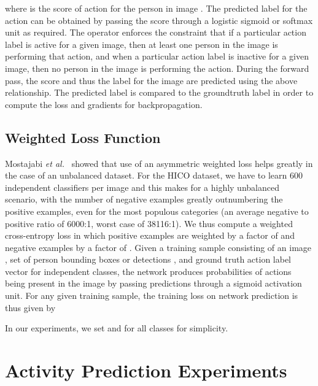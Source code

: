 \documentclass[runningheads]{llncs}
\begin{document}
where  is the score of action  for the person  in image . The predicted label for the action can be obtained by passing the score through a logistic sigmoid or softmax unit as required. The  operator enforces the constraint that if a particular action label is active for a given image, then at least one person in the image is performing that action, and when a particular action label is inactive for a given image, then no person in the image is performing the action. During the forward pass, the score and thus the label for the image are predicted using the above relationship. The predicted label is compared to the groundtruth label in order to compute the loss and gradients for backpropagation.




\subsection{Weighted Loss Function}
\label{subsec:wtd_loss}
Mostajabi \emph{et al.}~\cite{mostajabi2015feedforward} showed that use of an asymmetric weighted loss helps greatly in the case of an unbalanced dataset. For the HICO dataset, we have to learn 600 independent classifiers per image and this makes for a highly unbalanced scenario, with the number of negative examples greatly outnumbering the positive examples, even for the most populous categories (an average negative to positive ratio of 6000:1, worst case of 38116:1). We thus compute a weighted cross-entropy loss in which positive examples are weighted by a factor of  and negative examples by a factor of . Given a training sample  consisting of an image , set of person bounding boxes or detections , and ground truth action label vector  for  independent classes, the network produces probabilities of actions being present in the image by passing predictions through a sigmoid activation unit. For any given training sample, the training loss on network prediction  is thus given by

In our experiments, we set  and  for all classes for simplicity.


 



\section{Activity Prediction Experiments}
\label{subsec:activity_pred}
\end{document}
